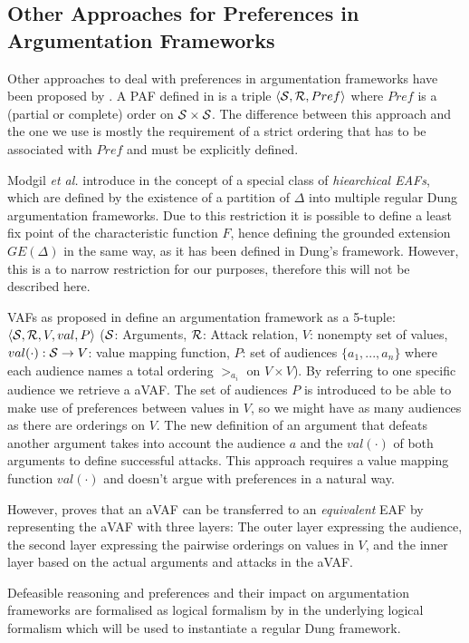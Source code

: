 \subsection{Other Approaches for Preferences in Argumentation Frameworks}
\label{app:other_afs}
\label{sub:paf}
Other approaches to deal with preferences in argumentation frameworks have been proposed by \cite{amgoud,amgoud1998,Bench2003,pollock1987, prakken1997}. A \gls{PAF} defined in \cite{amgoud1998} is  a triple $\langle \S, \R, Pref \rangle$ where $Pref$ is a (partial or complete) order on $\S \times \S$. The difference between this approach and the one we use is mostly the requirement of a strict ordering that has to be associated with $Pref$ and must be explicitly defined.

Modgil \textit{et al.} introduce in \cite{Modgil2009} the concept of a special class of \textit{hiearchical \glspl{EAF}}, which are defined by the existence of a partition of $\Delta$ into multiple regular Dung argumentation frameworks. Due to this restriction it is possible to define a least fix point of the characteristic function $F$, hence defining the grounded extension $GE(\Delta)$ in the same way, as it has been defined in Dung's framework. However, this is a to narrow restriction for our purposes, therefore this will not be described here. 

\label{sub:vaf}

\Glspl{VAF} as proposed in \cite{Bench2003} define an argumentation framework as a 5-tuple: $\langle \S, \R, V, val, P \rangle$ ($\S$: Arguments, $\R$: Attack relation, $V$: nonempty set of values, $val(\cdot): \S \rightarrow V$: value mapping function, $P$: set of audiences $\{a_1, ..., a_n\}$ where each audience names a total ordering $>_{a_i}$ on $V \times V$). By referring to one specific audience we retrieve a \gls{aVAF}. The set of audiences $P$ is introduced to be able to make use of preferences between values in $V$, so we might have as many audiences as there are orderings on $V$. The new definition of an argument that defeats another argument takes into account the audience $a$ and the $val(\cdot)$ of both arguments to define successful attacks. This approach requires a value mapping function $val(\cdot)$ and doesn't argue with preferences in a natural way. 

However, \cite{Modgil2009} proves that an \gls{aVAF} can be transferred to an \textit{equivalent} \gls{EAF} by representing the \gls{aVAF} with three layers: The outer layer expressing the audience, the second layer expressing the pairwise orderings on values in $V$, and the inner layer based on the actual arguments and attacks in the \gls{aVAF}.

Defeasible reasoning and preferences and their impact on argumentation frameworks are formalised as logical formalism by \cite{pollock1987, prakken1997} in the underlying logical formalism which will be used to instantiate a regular Dung framework.